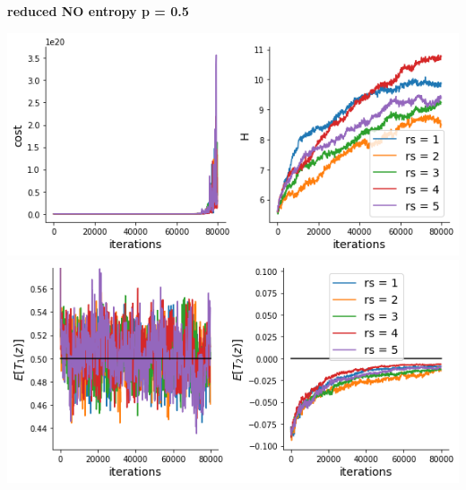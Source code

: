 \documentclass[11pt]{article}
\begin{document}
\textbf{reduced NO entropy p = 0.5}
\begin{center}
\includegraphics[scale=0.6]{figs/cost_H_SC_reduced_c=0_p=50.png} \\
\includegraphics[scale=0.6]{figs/constraints_SC_reduced_c=0_p=50.png}
\end{center}
\end{document}
